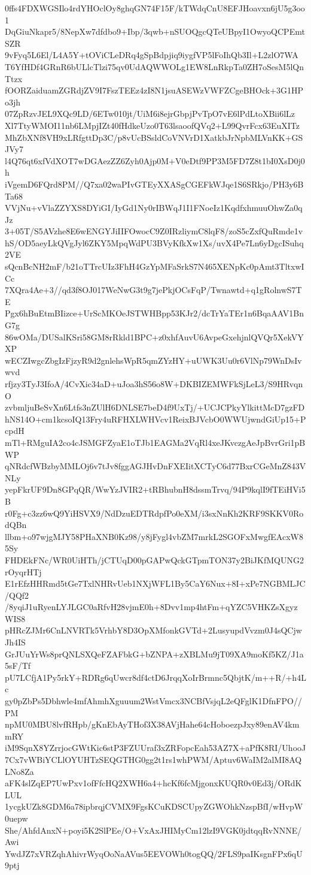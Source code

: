 0ffs4FDXWGSIlo4rdYHOclOy8ghqGN74F15F/kTWdqCnU8EFJHoavxn6jU5g3oo1
DqGiuNkapr5/8NepXw7dfdbo9+Ibp/3qwb+nSUOQgcQTeUBpyI1OwyoQCPEmtSZR
9vFyq5L6El/L4A5Y+tOViCLeDRq4gSpBdpjiq9iygfVP5lFoIhQb3Il+L2zlO7WA
T6YfHDf4GRnR6bULlcTlzi75qv0UdAQWWOLg1EW8LnRkpTa0ZH7oSesM5lQnTtzx
fOORZaiduamZGRdjZV9I7FszTEEz4zI8N1jsuASEWzVWFZCgeBHOck+3G1HPo3jh
07ZpRzvJEL9XQc9LD/6ETw010jt/UiM6i8ejrGbpjPvTpO7vE6lPdLtoXBii6lLz
Xl7TtyWMOI11nb6LMpjIZt40fHdkeUzo0T63lsaoofQVq2+L99QvrFcx63EuXITz
MhZbXNf8VH9xLRfgttDp3C/p8vUcBSsldCoVNVrD1XatkbJrNpbMLVnKK+GSJVy7
l4Q76qt6xfVdXOT7wDGAezZZ6Zyh0Ajp0M+V0eDtf9PP3M5FD7Z8t1bI0XsD0j0h
iVgemD6FQrd8PM//Q7xa02waPIvGTEyXXASgCGEFkWJqe1S6SRkjo/PH3y6BTa68
VVjNu+vVlaZZYXS8DYiGI/IyGd1Ny0rIBWqJ1I1FNoeIz1KqdfxhmuuOhwZa0qJz
3+05T/S5AVzhe8E6wENGYJiIIFOwocC9Z0IRzliymC8lqF8/zoS5cZxfQuRmde1v
hS/OD5aeyLkQVgJyl6ZKY5MpqWdPU3BVyKfkXw1Xs/uvX4Pe7Ln6yDgcISuhq2VE
sQcnBcNH2mF/b21oTTrcUIz3FhH4GzYpMFaSrkS7N465XENpKc0pAmt3TltxwICc
7XQra4Ae+3//qd3f8OJ017WeNwG3t9g7jePkjOCsFqP/Twnawtd+q1gRolnwS7TE
Pgx6hBuEtmBIizce+UrScMKOeJSTWHBpp53KJr2/dcTrYaTEr1n6BqaAAV1BnG7g
86wOMa/DUSalKSri58GM8rRkld1BPC+z0xhfAuvU6AvpeGxehjnlQVQr5XekVYXP
wECZIwgcZbgIzFjzyR9d2gnlehsWpR5qmZYzHY+uUWK3Uu0r6VlNp79WnDsIvwvd
rfjzy3TyJ3IfoA/4CvXic34aD+uJoa3hS56o8W+DKBIZEMWFkSjLeL3/S9HRvqnO
zvbmljuBeSvXn6Ltfs3nZUlH6DNLSE7beD4f9UxTj/+UCJCPkyYlkittMcD7gzFD
hNS14O+cm1kcsoIQ13Fry4uRFHXLWHVcv1ReixBJVcbO0WWUjwndGiUp15+PcpdH
mTl+RMguIA2co4cJSMGFZyaE1oTJb1EAGMa2VqRl4xeJKvczgAeJpBvrGri1pBWP
qNRdcfWBzbyMMLOj6v7tJv8fggAGJHvDnFXEIitXCTyC6d77BxrCGeMnZ843VNLy
yepFkrUF9Dn8GPqQR/WwYzJVIR2+tRBhubnH8dssmTrvq/94P9kqlI9fTEiHVi5B
r0Fg+c3zz6wQ9YiHSVX9/NdDzuEDTRdpfPo0eXM/i3sxNnKh2KRF9SKKV0RodQBn
llbm+o97wjgMJY58PHaXNB0Kz98/y8jFygl4vbZM7mrkL2SGOFxMwgfEAcxW85Sy
FHDEkFNc/WR0UiHTh/jCTUqD00pGAPwQckGTpmTON37y2BiJKfMQUNG2rOyqrHTj
E1rEfzHHRmd5tGe7TxlNHRvUeb1NXjWFL1By5CaY6Nux+8I+xPe7NGBMLJC/QQf2
/8yqiJ1uRyenLYJLGC0aRfvH28vjmE0h+8Dvv1mp4htFm+qYZC5VHKZsXgyzWIS8
pHRcZJMr6CnLNVRTk5VrhbY8D3OpXMfonkGVTd+2LusyupdVvzm0J4sQCjwJh4IS
GrJUuYrWs8prQNLSXQeFZAFbkG+bZNPA+zXBLMu9jT09XA9moKf5KZ/J1a5sF/Tf
pU7LCfjA1Py5rkY+RDRg6qUwcr8df4ctD6JrqqXoIrBrmnc5QbjtK/m++R/+h4Lc
gy0pZbPs5Dbhwle4mfAhmhXguuum2WstVmcx3NCBfVsjqL2eQFglK1DfnFPO//PM
npMU0MBU8lvfRHpb/gKnEbAyTHof3X38AVjHahe64cHoboezpJxy89enAV4kmmRY
iM9SqnX8YZrrjocGWtKic6stP3FZUUraf3xZRFopcEah53AZ7X+aPfK8RI/UhooJ
7Cx7vWBiYCLlOYUHTzSEQGTHG0gg2t1rs1whPWM/Aptuv6WaIM2alMI8AQLNo8Za
aFK4slZqEP7UwPxv1ofFfcHQ2XWH6a4+hcKf6fcMjgonxKUQR0v0Ed3j/ORdKLUL
1ycgkUZk8GDM6a78ipbrqjCVMX9FgsKCuKDSCUpyZGWOhkNzspBfI/wHvpW0uepw
She/AhfdAnxN+poyi5K2SlPEe/O+VxAxJHIMyCm12lzI9VGK0jdtqqRvNNNE/Awi
YwdJZ7xVRZqhAhivrWyqOoNaAVus5EEVOWh0togQQ/2FLS9paIKsgnFPx6qU9ptj
